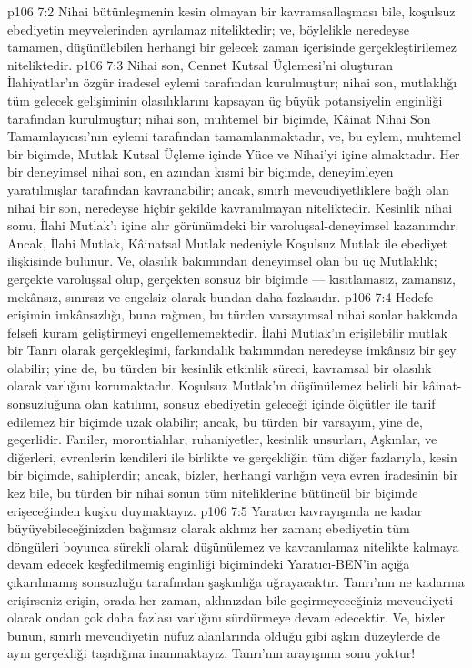 \vs p106 7:2 Nihai bütünleşmenin kesin olmayan bir kavramsallaşması bile, koşulsuz ebediyetin meyvelerinden ayrılamaz niteliktedir; ve, böylelikle neredeyse tamamen, düşünülebilen herhangi bir gelecek zaman içerisinde gerçekleştirilemez niteliktedir.
\vs p106 7:3 Nihai son, Cennet Kutsal Üçlemesi’ni oluşturan İlahiyatlar’ın özgür iradesel eylemi tarafından kurulmuştur; nihai son, mutlaklığı tüm gelecek gelişiminin olasılıklarını kapsayan üç büyük potansiyelin enginliği tarafından kurulmuştur; nihai son, muhtemel bir biçimde, Kâinat Nihai Son Tamamlayıcısı’nın eylemi tarafından tamamlanmaktadır, ve, bu eylem, muhtemel bir biçimde, Mutlak Kutsal Üçleme içinde Yüce ve Nihai’yi içine almaktadır. Her bir deneyimsel nihai son, en azından kısmi bir biçimde, deneyimleyen yaratılmışlar tarafından kavranabilir; ancak, sınırlı mevcudiyetliklere bağlı olan nihai bir son, neredeyse hiçbir şekilde kavranılmayan niteliktedir. Kesinlik nihai sonu, İlahi Mutlak’ı içine alır görünümdeki bir varoluşsal\hyp{}deneyimsel kazanımdır. Ancak, İlahi Mutlak, Kâinatsal Mutlak nedeniyle Koşulsuz Mutlak ile ebediyet ilişkisinde bulunur. Ve, olasılık bakımından deneyimsel olan bu üç Mutlaklık; gerçekte varoluşsal olup, gerçekten sonsuz bir biçimde --- kısıtlamasız, zamansız, mekânsız, sınırsız ve engelsiz olarak bundan daha fazlasıdır.
\vs p106 7:4 Hedefe erişimin imkânsızlığı, buna rağmen, bu türden varsayımsal nihai sonlar hakkında felsefi kuram geliştirmeyi engellememektedir. İlahi Mutlak’ın erişilebilir mutlak bir Tanrı olarak gerçekleşimi, farkındalık bakımından neredeyse imkânsız bir şey olabilir; yine de, bu türden bir kesinlik etkinlik süreci, kavramsal bir olasılık olarak varlığını korumaktadır. Koşulsuz Mutlak’ın düşünülemez belirli bir kâinat\hyp{}sonsuzluğuna olan katılımı, sonsuz ebediyetin geleceği içinde ölçütler ile tarif edilemez bir biçimde uzak olabilir; ancak, bu türden bir varsayım, yine de, geçerlidir. Faniler, morontialılar, ruhaniyetler, kesinlik unsurları, Aşkınlar, ve diğerleri, evrenlerin kendileri ile birlikte ve gerçekliğin tüm diğer fazlarıyla, kesin bir biçimde,  sahiplerdir; ancak, bizler, herhangi varlığın veya evren iradesinin bir kez bile, bu türden bir nihai sonun tüm niteliklerine bütüncül bir biçimde erişeceğinden kuşku duymaktayız.
\vs p106 7:5 Yaratıcı kavrayışında ne kadar büyüyebileceğinizden bağımsız olarak aklınız her zaman; ebediyetin tüm döngüleri boyunca sürekli olarak düşünülemez ve kavranılamaz nitelikte kalmaya devam edecek keşfedilmemiş enginliği biçimindeki Yaratıcı\hyp{}BEN’in açığa çıkarılmamış sonsuzluğu tarafından şaşkınlığa uğrayacaktır. Tanrı’nın ne kadarına erişirseniz erişin, orada her zaman, aklınızdan bile geçirmeyeceğiniz mevcudiyeti olarak ondan çok daha fazlası varlığını sürdürmeye devam edecektir. Ve, bizler bunun, sınırlı mevcudiyetin nüfuz alanlarında olduğu gibi aşkın düzeylerde de aynı gerçekliği taşıdığına inanmaktayız. Tanrı’nın arayışının sonu yoktur!
